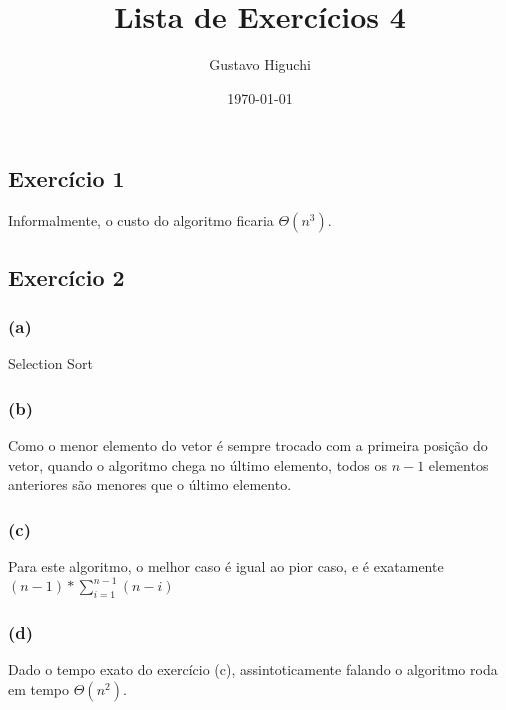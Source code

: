 \documentclass{article}
\title{Lista de Exercícios 4}
\author{Gustavo Higuchi}
\date{\today}
\begin{document}
\maketitle

\tableofcontents
\newpage


\chapter{}

\section{Exercício 1}
Informalmente, o custo do algoritmo ficaria $\Theta(n^3)$.

\section{Exercício 2}
\subsection*{(a)}
	\begin{algorithm}
	\caption{Selection Sort}
	\end{algorithm}

\subsection*{(b)}
    Como o menor elemento do vetor é sempre trocado com a primeira posição do vetor, 
    quando o algoritmo chega no último elemento, todos os $n-1$ elementos anteriores 
    são menores que o último elemento.

\subsection*{(c)}
    Para este algoritmo, o melhor caso é igual ao pior caso, e é exatamente $(n-1)*\sum\limits_{i=1}^{n-1}(n-i)$

\subsection*{(d)}
    Dado o tempo exato do exercício (c), assintoticamente falando o algoritmo roda em
    tempo $\Theta(n^2)$.
\\
\\
\end{document}
